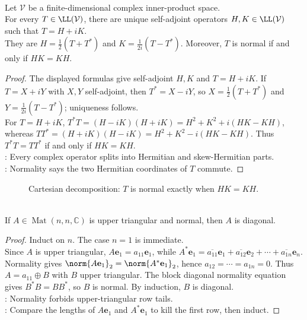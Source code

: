 \begin{proposition} \label{prop:cartesian-decomposition-normal-commuting-parts} \\
Let $\mathcal{V}$ be a finite-dimensional complex inner-product space.\\
For every $T\in\LL(\mathcal{V})$, there are unique self-adjoint operators $H,K\in\LL(\mathcal{V})$ such that $T=H+iK$.\\
They are $H=\frac{1}{2}(T+T^*)$ and $K=\frac{1}{2i}(T-T^*)$. Moreover, $T$ is normal if and only if $HK=KH$.
\begin{proof}
The displayed formulas give self-adjoint $H,K$ and $T=H+iK$. If $T=X+iY$ with $X,Y$ self-adjoint, then $T^*=X-iY$, so $X=\frac{1}{2}(T+T^*)$ and $Y=\frac{1}{2i}(T-T^*)$; uniqueness follows.\\
For $T=H+iK$, $T^*T=(H-iK)(H+iK)=H^2+K^2+i(HK-KH)$,\\
whereas $TT^*=(H+iK)(H-iK)=H^2+K^2-i(HK-KH)$. Thus $T^*T=TT^*$ if and only if $HK=KH$.\\
: Every complex operator splits into Hermitian and skew-Hermitian parts.\\
: Normality says the two Hermitian coordinates of $T$ commute.
\end{proof}
\end{proposition}

\begin{figure}[H]
  \centering
  
  \caption{Cartesian decomposition: $T$ is normal exactly when $HK=KH$.}
  \label{fig:cartesian-normal-commutation}
\end{figure}

\begin{lemma} \label{lem:upper-triangular-normal-matrix-is-diagonal} \\
If $A\in\operatorname{Mat}(n,n,\mathbb{C})$ is upper triangular and normal, then $A$ is diagonal.
\begin{proof}
Induct on $n$. The case $n=1$ is immediate.\\
Since $A$ is upper triangular, $A\mathbf{e}_1=a_{11}\mathbf{e}_1$, while $A^*\mathbf{e}_1=\overline{a_{11}}\mathbf{e}_1+\overline{a_{12}}\mathbf{e}_2+\cdots+\overline{a_{1n}}\mathbf{e}_n$.\\
Normality gives $\norm{A\mathbf{e}_1}_2=\norm{A^*\mathbf{e}_1}_2$, hence $a_{12}=\cdots=a_{1n}=0$. Thus $A=a_{11}\oplus B$ with $B$ upper triangular. The block diagonal normality equation gives $B^*B=BB^*$, so $B$ is normal. By induction, $B$ is diagonal.\\
: Normality forbids upper-triangular row tails.\\
: Compare the lengths of $A\mathbf{e}_1$ and $A^*\mathbf{e}_1$ to kill the first row, then induct.
\end{proof}
\end{lemma}

